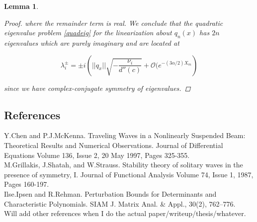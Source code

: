 \documentclass[12pt]{article}
\newtheorem{lemma}{Lemma}
\begin{document}
\begin{lemma}
\begin{proof}
where the remainder term is real. We conclude that the quadratic eigenvalue problem \eqref{quadeig} for the linearization about $q_n(x)$ has $2n$ eigenvalues which are purely imaginary and are located at

\begin{equation}
\lambda_i^\pm = \pm i \left( ||q_x|| \sqrt{ -\frac{ \nu_i}{d''(c)} } + \mathcal{O}(e^{-(3 \alpha/2) X_m} \right)
\end{equation}

since we have complex-conjugate symmetry of eigenvalues.

\end{proof}
\end{lemma}


\subsection{References}

Y.Chen and P.J.McKenna. Traveling Waves in a Nonlinearly Suspended Beam: Theoretical Results and Numerical Observations. Journal of Differential Equations Volume 136, Issue 2, 20 May 1997, Pages 325-355.\\

M.Grillakis, J.Shatah, and W.Strauss. Stability theory of solitary waves in the presence of symmetry, I. Journal of Functional Analysis Volume 74, Issue 1, 1987, Pages 160-197.\\

Ilse.Ipsen and R.Rehman. Perturbation Bounds for Determinants and Characteristic Polynomials. SIAM J. Matrix Anal. \& Appl., 30(2), 762–776.\\

Will add other references when I do the actual paper/writeup/thesis/whatever.
\end{document}
